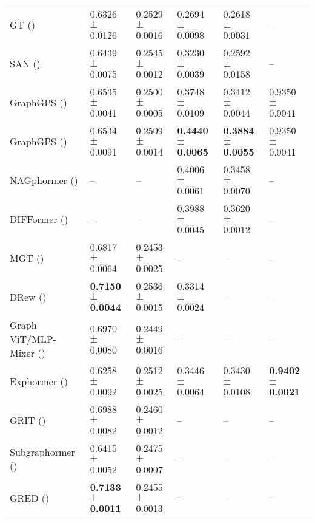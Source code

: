 \begin{table*}[t]
{\begin{tabular}{l|lllll}
        \midrule %
        GT (\citeyear{dwivedi2020generalization}) & 0.6326{\tiny{ $\pm$ 0.0126}} & 0.2529{\tiny{ $\pm$ 0.0016}} & 0.2694{\tiny{ $\pm$ 0.0098}} & 0.2618{\tiny{ $\pm$ 0.0031}} &  –  \\
        SAN (\citeyear{kreuzer2021rethinking}) & 0.6439{\tiny{ $\pm$ 0.0075}} &0.2545{\tiny{ $\pm$ 0.0012}} &  0.3230{\tiny{ $\pm$ 0.0039}} & 0.2592{\tiny{ $\pm$ 0.0158}} &  –  \\
        GraphGPS (\citeyear{rampavsek2022recipe}) & 0.6535{\tiny{ $\pm$ 0.0041}} &0.2500{\tiny{ $\pm$ 0.0005}} &0.3748{\tiny{ $\pm$ 0.0109}} &0.3412{\tiny{ $\pm$ 0.0044}} & 0.9350{\tiny{ $\pm$ 0.0041}} \\
        GraphGPS (\citeyear{tonshoff2023did}) & 0.6534{\tiny{ $\pm$ 0.0091}} & 0.2509{\tiny{ $\pm$ 0.0014}} & \textbf{\textcolor{tealblue!90}{0.4440{\tiny{ $\pm$ 0.0065}}}} & \textbf{\textcolor{tealblue!90}{0.3884{\tiny{ $\pm$ 0.0055}}}} & 0.9350{\tiny{ $\pm$ 0.0041}} \\
        NAGphormer  (\citeyear{chen2023nagphormer}) &–&–& 0.4006{\tiny{ $\pm$ 0.0061}}& 0.3458{\tiny{ $\pm$ 0.0070}} &– \\
         DIFFormer  (\citeyear{wu2023difformer}) &–&–& 0.3988{\tiny{ $\pm$ 0.0045}}& 0.3620{\tiny{ $\pm$ 0.0012}} &– \\
        MGT (\citeyear{ngo2023multiresolution}) & 0.6817{\tiny{ $\pm$ 0.0064}}  & 0.2453{\tiny{ $\pm$ 0.0025}} &– &– &– \\
        DRew (\citeyear{gutteridge2023drew}) & \textbf{\textcolor{tealblue!90}{0.7150{\tiny{ $\pm$ 0.0044}}}} & 0.2536{\tiny{ $\pm$ 0.0015}} & 0.3314{\tiny{ $\pm$ 0.0024}} &– &–  \\
        Graph ViT/MLP-Mixer (\citeyear{he2023generalization}) &0.6970{\tiny{ $\pm$ 0.0080}} & 0.2449{\tiny{ $\pm$ 0.0016}} &– &– &–\\
        Exphormer (\citeyear{shirzad2023exphormer}) & 0.6258{\tiny{ $\pm$ 0.0092}} &0.2512{\tiny{ $\pm$ 0.0025}} &0.3446{\tiny{ $\pm$ 0.0064}} &0.3430{\tiny{ $\pm$ 0.0108}}& \textbf{\textcolor{darkorange!90}{0.9402{\tiny{ $\pm$ 0.0021}}}}\\
        GRIT (\citeyear{ma2023graph}) & 0.6988{\tiny{ $\pm$ 0.0082}} &0.2460{\tiny{ $\pm$ 0.0012}} &– &– &–  \\
        Subgraphormer (\citeyear{bar2024subgraphormer})  & 0.6415{\tiny{ $\pm$ 0.0052}} & 0.2475{\tiny{ $\pm$ 0.0007}} &– &– &–\\
        GRED (\citeyear{ding2024recurrent}) & \textbf{\textcolor{darkorange!90}{0.7133{\tiny{ $\pm$ 0.0011}}}} & 0.2455{\tiny{ $\pm$ 0.0013}} &– &– &–\\

\end{tabular}}
\end{table*}

